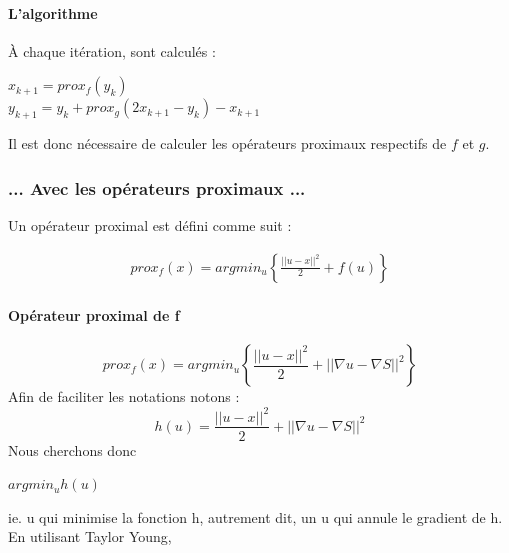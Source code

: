 \paragraph{L'algorithme}
À chaque itération, sont calculés : 
\begin{center}
$x_{k+1} = prox_f(y_k)$\\
$y_{k+1} = y_k+prox_g(2x_{k+1}-y_k)-x_{k+1}$
\end{center}{}
Il est donc nécessaire de calculer les opérateurs proximaux respectifs de $f$ et $g$. 
\subsubsection{... Avec les opérateurs proximaux ...}
Un opérateur proximal est défini comme suit : 
\begin{center}
\begin{equation*}
\begin{aligned}
prox_f(x) = argmin_u \left\{ \frac{||u-x||^2}{2}+ f(u)\right\}
\end{aligned}
\end{equation*}
\end{center}
\cite{Opti}
\paragraph{Opérateur proximal de f}
\begin{equation*}
prox_f(x) = argmin_u\left\{\frac{||u-x||^2}{2}+||\nabla u -\nabla S ||^2 \right\}
\end{equation*}
Afin de faciliter les notations notons :
\begin{equation*}
h(u) = \frac{||u-x||^2}{2}+||\nabla u -\nabla S ||^2
\end{equation*} 
Nous cherchons donc 
\begin{center}
$argmin_u h(u)$
\end{center}
ie. u qui minimise la fonction h, autrement dit, un u qui annule le gradient de h.\\
En utilisant Taylor Young, 

